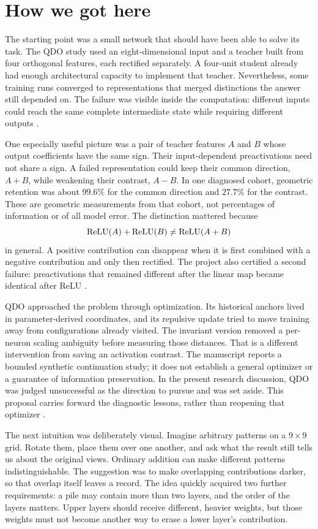 \section{How we got here}
\label{sec:story}

The starting point was a small network that should have been able to solve its
task. The QDO study used an eight-dimensional input and a teacher built from four
orthogonal features, each rectified separately. A four-unit student already had
enough architectural capacity to implement that teacher. Nevertheless, some
training runs converged to representations that merged distinctions the answer
still depended on. The failure was visible inside the computation: different
inputs could reach the same complete intermediate state while requiring different
outputs \cite{qdo,projection}.

One especially useful picture was a pair of teacher features \(A\) and \(B\)
whose output coefficients have the same sign. Their input-dependent
preactivations need not share a sign. A failed
representation could keep their common direction, \(A+B\), while weakening their
contrast, \(A-B\). In one diagnosed cohort, geometric retention was about
\(99.6\%\) for the common direction and \(27.7\%\) for the contrast. These are
geometric measurements from that cohort, not percentages of information or of
all model error. The distinction mattered because
\[
  \operatorname{ReLU}(A)+\operatorname{ReLU}(B)\ne\operatorname{ReLU}(A+B)
\]
in general. A positive contribution can disappear when it is first combined with
a negative contribution and only then rectified. The project also certified a
second failure: preactivations that remained different after the linear map
became identical after ReLU \cite{qdo,projection}.

QDO approached the problem through optimization. Its historical anchors lived in
parameter-derived coordinates, and its repulsive update tried to move training
away from configurations already visited. The invariant version removed a
per-neuron scaling ambiguity before measuring those distances. That is a different
intervention from saving an activation contrast. The manuscript reports a
bounded synthetic continuation study; it does not establish a general optimizer
or a guarantee of information preservation. In the present research discussion,
QDO was judged unsuccessful as the direction to pursue and was set aside. This
proposal carries forward the diagnostic lessons, rather than reopening that
optimizer \cite{qdo,discussion}.

The next intuition was deliberately visual. Imagine arbitrary patterns on a
\(9\times9\) grid. Rotate them, place them over one another, and ask what the
result still tells us about the original views. Ordinary addition can make
different patterns indistinguishable. The suggestion was to make overlapping
contributions darker, so that overlap itself leaves a record. The idea quickly
acquired two further requirements: a pile may contain more than two layers, and
the order of the layers matters. Upper layers should receive different, heavier
weights, but those weights must not become another way to erase a lower layer's
contribution.

